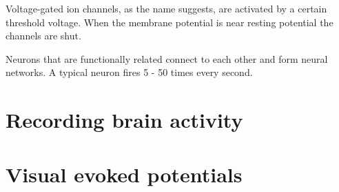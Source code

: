 Voltage-gated ion channels, as the name suggests, are activated by a certain threshold voltage. When the membrane potential is near resting potential the channels are shut. 

Neurons that are functionally related connect to each other and form neural networks.
A typical neuron fires 5 - 50 times every second.
\section{Recording brain activity}
\section{Visual evoked potentials}
 